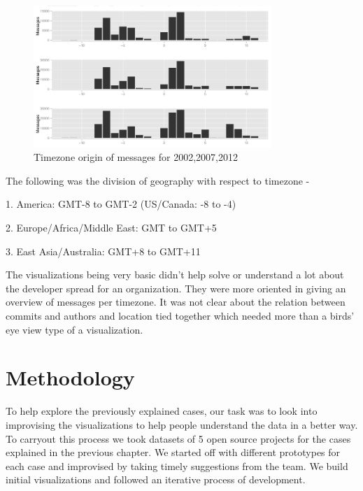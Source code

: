\documentclass[seploa]{beavtex}
\begin{document}
\begin{figure}[!ht]
\centering
\includegraphics[width=90mm]{work2.png}
\caption{Timezone origin of messages for 2002,2007,2012}
\end{figure}

The following was the division of geography with respect to timezone -

1. America: GMT-8 to GMT-2 (US/Canada: -8 to -4)

2. Europe/Africa/Middle East: GMT to GMT+5

3. East Asia/Australia: GMT+8 to GMT+11


The visualizations being very basic didn't help solve or understand a lot about the developer spread for an organization. They were more oriented in giving an overview of messages per timezone. It was not clear about the relation between commits and authors and location tied together which needed more than a birds' eye view type of a visualization. 


\chapter{Methodology}
To help explore the previously explained cases, our task was to look into improvising the visualizations to help people understand the data in a better way. To carryout this process we took datasets of 5 open source projects for the cases explained in the previous chapter. We started off with different prototypes for each case and improvised by taking timely suggestions from the team. We build initial visualizations and followed an iterative process of development.
\end{document}
